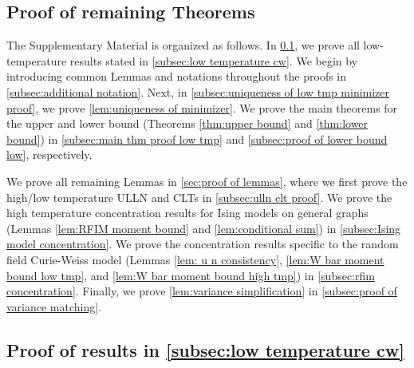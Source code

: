 \documentclass[preprint,reqno]{imsart}
\begin{document}
%

%
%
%



%
%
%
%
%
%
%
%
%
%
%
%
%
%
%
%

%
%
%
%
%
%
%
%
%
%
\begin{supplement}
\end{supplement}

%
%
%
%
%
%
%
%
%
%
%
%
%
%
%

%

%
%
%
%





\begin{appendix}
%



\section*{Proof of remaining Theorems}
The Supplementary Material is organized as follows. In \cref{sec:proof of main results}, we prove all low-temperature results stated in \cref{subsec:low temperature cw}. 
{
We begin by introducing common Lemmas and notations throughout the proofs in \cref{subsec:additional notation}. Next, in \cref{subsec:uniqueness of low tmp minimizer proof}, we prove \cref{lem:uniqueness of minimizer}. We prove the main theorems for the upper and lower bound (Theorems \ref{thm:upper bound} and \ref{thm:lower bound}) in \cref{subsec:main thm proof low tmp} and \cref{subsec:proof of lower bound low}, respectively.
}

{
We prove all remaining Lemmas in \cref{sec:proof of lemmas}, where we first prove the high/low temperature ULLN and CLTs in \cref{subsec:ulln clt proof}. We prove the high temperature concentration results for Ising models on general graphs (Lemmas \ref{lem:RFIM moment bound} and \ref{lem:conditional sum}) in \cref{subsec:Ising model concentration}.
We prove the concentration results specific to the random field Curie-Weiss model (Lemmas \ref{lem: u n consistency}, \ref{lem:W bar moment bound low tmp}, and \ref{lem:W bar moment bound high tmp}) in \cref{subsec:rfim concentration}. Finally, we prove \cref{lem:variance simplification} in \cref{subsec:proof of variance matching}.
}

\subsection{Proof of results in \cref{subsec:low temperature cw}}\label{sec:proof of main results}
%


\end{appendix}
\end{document}
